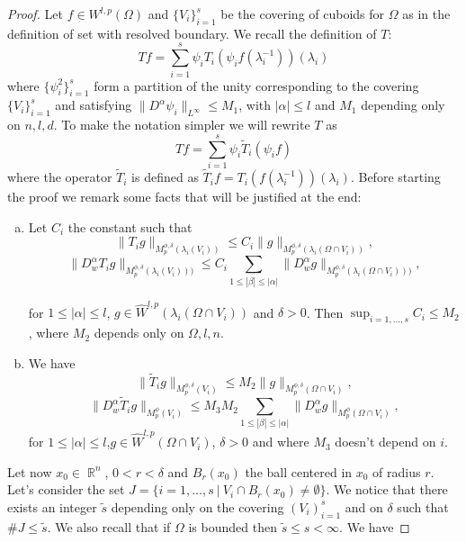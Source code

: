 \documentclass[12pt]{article}
\theoremstyle{definition}
\DeclareMathOperator\rr{\mathbb{R}}
\begin{document}
\begin{proof}
Let $f \in W^{l,p}(\Omega)$ and  $\{V_i\}_{i=1}^s$ be the covering of cuboids for $\Omega$ as in the definition of set with resolved boundary. We recall the definition of $T:$
\[ Tf = \sum_{i=1}^s \psi_iT_i(\psi_if(\lambda_i^{-1}))(\lambda_i)\]
where $\{ \psi^2_i \}_{i=1}^s$ form a partition of the unity corresponding to the covering $\{V_i\}_{i=1}^s$ and satisfying $\|D^\alpha \psi_i \|_{L^\infty}\le M_1$, with $|\alpha|\le l$ and $M_1$ depending only on $n,l,d$. To make the notation simpler we will rewrite $T$ as
\[ Tf = \sum_{i=1}^s \psi_i\widetilde T_i(\psi_if)\]
where the operator $\widetilde T_i$ is defined as $\widetilde T_i f = T_i(f(\lambda_i^{-1}))(\lambda_i)$. 
Before starting the proof we remark some facts that will be justified at the end:
\begin{enumerate}[a)]

\item Let $C_i$ the constant such that
\[ \| T_ig\|_{M_p^{\phi,\delta}(\lambda_i(V_i))}\le C_i \|g\|_{M_p^{\phi,\delta}(\lambda_i(\Omega \cap V_i))},\]
\[\| D^\alpha_w T_ig\|_{M_p^{\phi,\delta}(\lambda_i(V_i)))} \le   C_i\sum_{1\le |\beta|\le|\alpha| }\| D^\alpha_wg\|_{M_p^{\phi,\delta}(\lambda_i(\Omega \cap V_i)))},\]  

for $1\le |\alpha|\le l$, $g \in \widehat W^{l,p}(\lambda_i(\Omega \cap V_i))$ and $\delta>0$. Then $\sup_{i=1,...,s} C_i \le M_2$, where $M_2$ depends only on $\Omega,l,n$.
\item We have
\[ \| \widetilde T_ig\|_{M_p^{\phi,\delta}(V_i)}\le M_2 \|g\|_{M_p^{\phi,\delta}(\Omega \cap V_i)},\]
\[\| D^\alpha_w \widetilde T_ig\|_{M_p^\phi(V_i)} \le   M_3M_2\sum_{1\le |\beta|\le|\alpha| }\| D^\alpha_wg\|_{M_p^\phi(\Omega \cap V_i)},\]  
for $1\le |\alpha|\le l$,$g \in \widehat W^{l,p}(\Omega \cap V_i)$, $\delta>0$ and where $M_3$ doesn't depend on $i$. 
\end{enumerate}
Let now $x_0 \in \rr^n$, $0<r<\delta$ and $B_r(x_0)$ the ball centered in $x_0$ of radius $r.$ Let's consider the set $J=\{ i=1,...,s \ | \ V_i \cap B_r(x_0) \neq \emptyset\}.$
We notice that there exists an integer $\widetilde s$ depending only on the covering $(V_i)_{i=1}^s$ and on $\delta$ such that $\# J\le \widetilde s.$ We also recall that if $\Omega$ is bounded then $\widetilde s\le s<\infty$. We have




\end{proof}
\end{document}
